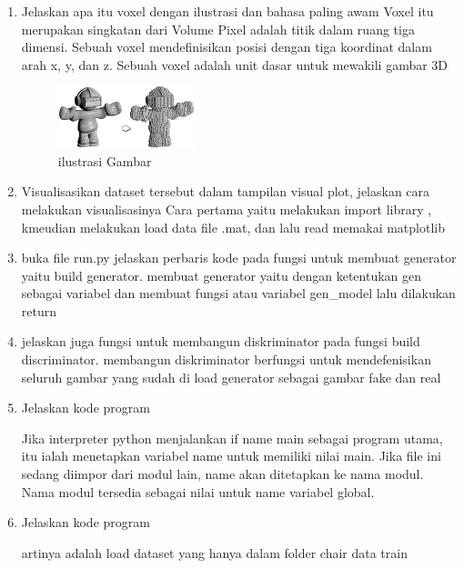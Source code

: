 \begin{enumerate}
        \item Jelaskan apa itu voxel dengan ilustrasi dan bahasa paling awam
        Voxel itu merupakan singkatan dari Volume Pixel adalah titik dalam ruang tiga dimensi. Sebuah voxel mendefinisikan posisi dengan tiga koordinat dalam arah x, y, dan z. Sebuah voxel adalah unit dasar untuk mewakili gambar 3D
            \begin{figure}[H]
                \includegraphics[width=4cm]{figures/1174057/chapter8/praktek7.png}
                \centering
                \caption{ilustrasi Gambar}
            \end{figure}        
        
        \item Visualisasikan dataset tersebut dalam tampilan visual plot, jelaskan cara melakukan visualisasinya
        Cara pertama yaitu melakukan import library , kmeudian melakukan load data file .mat, dan lalu read memakai matplotlib
        
        \item buka file run.py jelaskan perbaris kode pada fungsi untuk membuat generator yaitu build generator.
        membuat generator yaitu dengan ketentukan gen sebagai variabel dan membuat fungsi atau variabel gen\_model lalu dilakukan return
        
        \item jelaskan juga fungsi untuk membangun diskriminator pada fungsi build discriminator.
        membangun diskriminator berfungsi untuk mendefenisikan seluruh gambar yang sudah di load generator sebagai gambar fake dan real
        
        \item Jelaskan kode program
        
        Jika interpreter python menjalankan if name main  sebagai program utama, itu ialah menetapkan variabel name  untuk memiliki nilai main. Jika file ini sedang diimpor dari modul lain, name akan ditetapkan ke nama modul. Nama modul tersedia sebagai nilai untuk name variabel global.
        
        \item Jelaskan kode program 
        
        artinya adalah load dataset yang hanya dalam folder chair data train
        

\end{enumerate}
